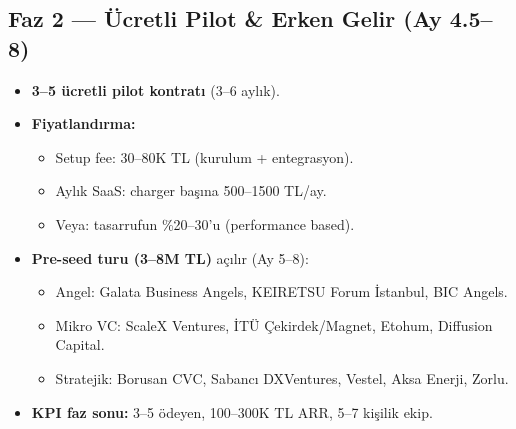 \documentclass[11pt,a4paper]{article}
\begin{document}
\subsection{Faz 2 --- Ücretli Pilot \& Erken Gelir (Ay 4.5--8)}
\begin{itemize}
    \item \textbf{3--5 ücretli pilot kontratı} (3--6 aylık).
    \item \textbf{Fiyatlandırma:}
        \begin{itemize}
            \item Setup fee: 30--80K TL (kurulum + entegrasyon).
            \item Aylık SaaS: charger başına 500--1500 TL/ay.
            \item Veya: tasarrufun \%20--30'u (performance based).
        \end{itemize}
    \item \textbf{Pre-seed turu (3--8M TL)} açılır (Ay 5--8):
        \begin{itemize}
            \item Angel: Galata Business Angels, KEIRETSU Forum İstanbul, BIC Angels.
            \item Mikro VC: ScaleX Ventures, İTÜ Çekirdek/Magnet, Etohum, Diffusion Capital.
            \item Stratejik: Borusan CVC, Sabancı DXVentures, Vestel, Aksa Enerji, Zorlu.
        \end{itemize}
    \item \textbf{KPI faz sonu:} 3--5 ödeyen, 100--300K TL ARR, 5--7 kişilik ekip.
\end{itemize}
\end{document}
